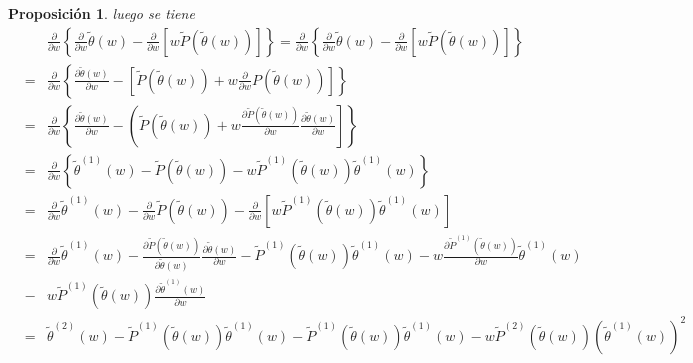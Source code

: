 \documentclass{article}
\newtheorem{Prop}{Proposición}[section]
\numberwithin{equation}{section}
\begin{document}
\begin{Prop}
luego se tiene
\begin{eqnarray*}
&&\frac{\partial}{\partial w}\left\{\frac{\partial}{\partial w}\tilde{\theta}\left(w\right)-\frac{\partial}{\partial w}\left[w\tilde{P}\left(\tilde{\theta}\left(w\right)\right)\right]\right\}
=\frac{\partial}{\partial w}\left\{\frac{\partial}{\partial w}\tilde{\theta}\left(w\right)-\frac{\partial}{\partial w}\left[w\tilde{P}\left(\tilde{\theta}\left(w\right)\right)\right]\right\}\\
&=&\frac{\partial}{\partial w}\left\{\frac{\partial \tilde{\theta}\left(w\right)}{\partial w}-\left[\tilde{P}\left(\tilde{\theta}\left(w\right)\right)+w\frac{\partial}{\partial w}P\left(\tilde{\theta}\left(w\right)\right)\right]\right\}\\
&=&\frac{\partial}{\partial w}\left\{\frac{\partial \tilde{\theta}\left(w\right)}{\partial w}-\left(\tilde{P}\left(\tilde{\theta}\left(w\right)\right)+w\frac{\partial \tilde{P}\left(\tilde{\theta}\left(w\right)\right)}{\partial w}\frac{\partial \tilde{\theta}\left(w\right)}{\partial w}\right]\right\}\\
&=&\frac{\partial}{\partial w}\left\{\tilde{\theta}^{(1)}\left(w\right)-\tilde{P}\left(\tilde{\theta}\left(w\right)\right)-w\tilde{P}^{(1)}\left(\tilde{\theta}\left(w\right)\right)\tilde{\theta}^{(1)}\left(w\right)\right\}\\
&=&\frac{\partial}{\partial w}\tilde{\theta}^{(1)}\left(w\right)-\frac{\partial}{\partial w}\tilde{P}\left(\tilde{\theta}\left(w\right)\right)-\frac{\partial}{\partial w}\left[w\tilde{P}^{(1)}\left(\tilde{\theta}\left(w\right)\right)\tilde{\theta}^{(1)}\left(w\right)\right]\\
&=&\frac{\partial}{\partial w}\tilde{\theta}^{(1)}\left(w\right)-\frac{\partial\tilde{P}\left(\tilde{\theta}\left(w\right)\right)}{\partial\tilde{\theta}\left(w\right)}\frac{\partial \tilde{\theta}\left(w\right)}{\partial w}-\tilde{P}^{(1)}\left(\tilde{\theta}\left(w\right)\right)\tilde{\theta}^{(1)}\left(w\right)-w\frac{\partial\tilde{P}^{(1)}\left(\tilde{\theta}\left(w\right)\right)}{\partial w}\tilde{\theta}^{(1)}\left(w\right)\\
&-&w\tilde{P}^{(1)}\left(\tilde{\theta}\left(w\right)\right)\frac{\partial \tilde{\theta}^{(1)}\left(w\right)}{\partial w}\\
&=&\tilde{\theta}^{(2)}\left(w\right)-\tilde{P}^{(1)}\left(\tilde{\theta}\left(w\right)\right)\tilde{\theta}^{(1)}\left(w\right)-\tilde{P}^{(1)}\left(\tilde{\theta}\left(w\right)\right)\tilde{\theta}^{(1)}\left(w\right)-w\tilde{P}^{(2)}\left(\tilde{\theta}\left(w\right)\right)\left(\tilde{\theta}^{(1)}\left(w\right)\right)^{2}\\

\end{eqnarray*}
\end{Prop}
\end{document}
